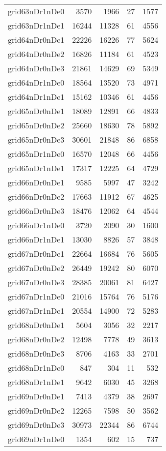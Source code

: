 \begin{tabular}{lrrrr}
grid63nDr1nDe0 & 3570 & 1966 & 27 & 1577 \\
grid63nDr1nDe1 & 16244 & 11328 & 61 & 4556 \\
grid64nDr0nDe1 & 22226 & 16226 & 77 & 5624 \\
grid64nDr0nDe2 & 16826 & 11184 & 61 & 4523 \\
grid64nDr0nDe3 & 21861 & 14629 & 69 & 5349 \\
grid64nDr1nDe0 & 18564 & 13520 & 73 & 4971 \\
grid64nDr1nDe1 & 15162 & 10346 & 61 & 4456 \\
grid65nDr0nDe1 & 18089 & 12891 & 66 & 4833 \\
grid65nDr0nDe2 & 25660 & 18630 & 78 & 5892 \\
grid65nDr0nDe3 & 30601 & 21848 & 86 & 6858 \\
grid65nDr1nDe0 & 16570 & 12048 & 66 & 4456 \\
grid65nDr1nDe1 & 17317 & 12225 & 64 & 4729 \\
grid66nDr0nDe1 & 9585 & 5997 & 47 & 3242 \\
grid66nDr0nDe2 & 17663 & 11912 & 67 & 4625 \\
grid66nDr0nDe3 & 18476 & 12062 & 64 & 4544 \\
grid66nDr1nDe0 & 3720 & 2090 & 30 & 1600 \\
grid66nDr1nDe1 & 13030 & 8826 & 57 & 3848 \\
grid67nDr0nDe1 & 22664 & 16684 & 76 & 5605 \\
grid67nDr0nDe2 & 26449 & 19242 & 80 & 6070 \\
grid67nDr0nDe3 & 28385 & 20061 & 81 & 6427 \\
grid67nDr1nDe0 & 21016 & 15764 & 76 & 5176 \\
grid67nDr1nDe1 & 20554 & 14900 & 72 & 5283 \\
grid68nDr0nDe1 & 5604 & 3056 & 32 & 2217 \\
grid68nDr0nDe2 & 12498 & 7778 & 49 & 3613 \\
grid68nDr0nDe3 & 8706 & 4163 & 33 & 2701 \\
grid68nDr1nDe0 & 847 & 304 & 11 & 532 \\
grid68nDr1nDe1 & 9642 & 6030 & 45 & 3268 \\
grid69nDr0nDe1 & 7413 & 4379 & 38 & 2697 \\
grid69nDr0nDe2 & 12265 & 7598 & 50 & 3562 \\
grid69nDr0nDe3 & 30973 & 22344 & 86 & 6744 \\
grid69nDr1nDe0 & 1354 & 602 & 15 & 737 \\

\end{tabular}

